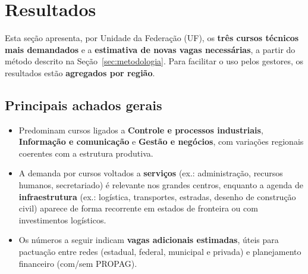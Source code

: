 \section{Resultados}

Esta seção apresenta, por Unidade da Federação (UF), os \textbf{três cursos técnicos mais demandados} e a \textbf{estimativa de novas vagas necessárias}, a partir do método descrito na Seção~\ref{sec:metodologia}. Para facilitar o uso pelos gestores, os resultados estão \textbf{agregados por região}. 

\subsection*{Principais achados gerais}
\begin{itemize}
  \item Predominam cursos ligados a \textbf{Controle e processos industriais}, \textbf{Informação e comunicação} e \textbf{Gestão e negócios}, com variações regionais coerentes com a estrutura produtiva.
  \item A demanda por cursos voltados a \textbf{serviços} (ex.: administração, recursos humanos, secretariado) é relevante nos grandes centros, enquanto a agenda de \textbf{infraestrutura} (ex.: logística, transportes, estradas, desenho de construção civil) aparece de forma recorrente em estados de fronteira ou com investimentos logísticos.
  \item Os números a seguir indicam \textbf{vagas adicionais estimadas}, úteis para pactuação entre redes (estadual, federal, municipal e privada) e planejamento financeiro (com/sem PROPAG).
\end{itemize}

